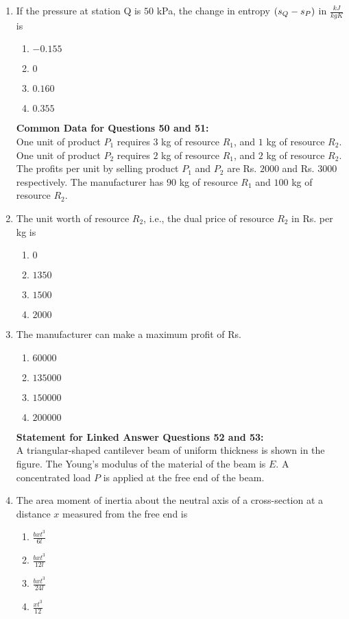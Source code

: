 \documentclass[journal,12pt,twocolumn]{IEEEtran}
\theoremstyle{remark}
\begin{document}
\begin{enumerate}[start=40]
    \item If the pressure at station Q is $50$ kPa, the change in entropy $\left(s_Q - s_P\right)$ in $\frac{kJ}{kgK}$ is
    \begin{enumerate}
        \item $-0.155$
        \item $0$
        \item $0.160$
        \item $0.355$
    \end{enumerate}

\textbf{Common Data for Questions 50 and 51:} \\
One unit of product $P_1$ requires $3$ kg of resource $R_1$, and $1$ kg of resource $R_2$. One unit of product $P_2$ requires $2$ kg of resource $R_1$, and $2$ kg of resource $R_2$. The profits per unit by selling product $P_1$ and $P_2$ are Rs. $2000$ and Rs. $3000$ respectively. The manufacturer has $90$ kg of resource $R_1$ and $100$ kg of resource $R_2$.

    \item The unit worth of resource $R_2$, i.e., the dual price of resource $R_2$ in Rs. per kg is
    \begin{enumerate}
        \item $0$
        \item $1350$
        \item $1500$
        \item $2000$
    \end{enumerate}

    \item The manufacturer can make a maximum profit of Rs.
    \begin{enumerate}
        \item $60000$
        \item $135000$
        \item $150000$
        \item $200000$
    \end{enumerate}



\textbf{Statement for Linked Answer Questions 52 and 53:} \\
A triangular-shaped cantilever beam of uniform thickness is shown in the figure. The Young's modulus of the material of the beam is $E$. A concentrated load $P$ is applied at the free end of the beam.


    \item The area moment of inertia about the neutral axis of a cross-section at a distance $x$ measured from the free end is
    \begin{enumerate}
        \item $\frac{b x t^3}{6l}$
        \item $\frac{b x t^3}{12l}$
        \item $\frac{b x t^3}{24l}$
        \item $\frac{ x t^3}{12}$
    \end{enumerate}

    

    




    


\end{enumerate}
\end{document}
